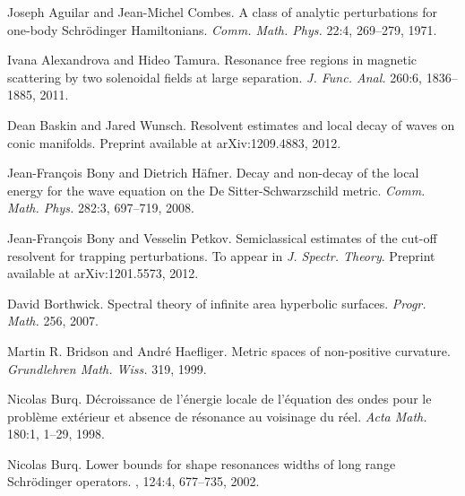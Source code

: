 \documentclass[reqno, 12pt]{amsart}
\theoremstyle{definition}
\numberwithin{equation}{section}
\numberwithin{prop}{section}
\numberwithin{figure}{section}
\begin{document}
\begin{thebibliography}{00}
 Joseph Aguilar and Jean-Michel Combes. A class of analytic perturbations for one-body Schr\"odinger Hamiltonians. \textit{Comm. Math. Phys.} 22:4, 269--279, 1971.

 Ivana Alexandrova and Hideo Tamura. Resonance free regions in magnetic scattering by two solenoidal fields at large separation. \textit{J. Func. Anal.} 260:6, 1836--1885, 2011.

 Dean Baskin and Jared Wunsch. Resolvent estimates and local decay of waves on conic manifolds. Preprint available at arXiv:1209.4883, 2012.



 Jean-Fran\c cois Bony and Dietrich H\"afner. Decay and non-decay of the local energy for the wave equation on the De Sitter-Schwarzschild metric. \textit{Comm. Math. Phys.} 282:3, 697--719, 2008.

 Jean-Fran\c cois Bony and Vesselin Petkov. Semiclassical estimates of the cut-off resolvent for trapping perturbations. To appear in \textit{J. Spectr. Theory}. Preprint available at arXiv:1201.5573, 2012.

 David Borthwick. Spectral theory of infinite area hyperbolic surfaces. \textit{Progr. Math.} 256, 2007.

 Martin R. Bridson and Andr\'e Haefliger. Metric spaces of non-positive curvature. \textit{Grundlehren Math. Wiss.} 319, 1999.

 Nicolas Burq. D\'ecroissance de l'\'energie locale de l'\'equation des ondes pour le probl\`eme ext\'erieur et absence de r\'esonance au voisinage du r\'eel. %
 \textit{Acta Math.} 180:1, 1--29, 1998.
 
Nicolas Burq.
\newblock Lower bounds for shape resonances widths of long range
  {S}chr\"odinger operators.
, 124:4, 677--735, 2002.


\end{thebibliography}
\end{document}
